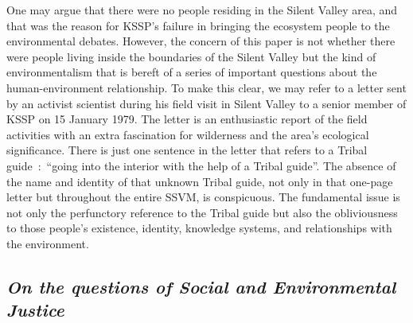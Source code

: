 \documentclass[twoside, 13pt]{article}
\begin{document}
{{{{One may argue that there were no people residing in the Silent Valley area, and that was the reason for KSSP’s failure in bringing the ecosystem people to the environmental debates. However, the concern of this paper is not whether there were people living inside the boundaries of the Silent Valley but the kind of environmentalism that is bereft of a series of important questions about the human-environment relationship. To make this clear, we may refer to a letter sent by an activist scientist during his field visit in Silent Valley to a senior member of KSSP on 15 January 1979. The letter is an enthusiastic report of the field activities with an extra fascination for wilderness and the area’s ecological significance. There is just one sentence in the letter that refers to a Tribal guide~:~“going into the interior with the help of a Tribal guide”. The absence of the name and identity of that unknown Tribal guide, not only in that one-page letter but throughout the entire SSVM, is conspicuous. The fundamental issue is not only the perfunctory reference to the Tribal guide but also the obliviousness to those people’s existence, identity, knowledge systems, and relationships with the environment.} 

\vspace{-.2cm}

{\fontsize{8}{10}\selectfont\subsection*{\textit{ On the questions of Social and Environmental Justice}}

}}}}
\end{document}
